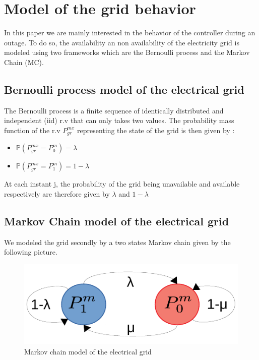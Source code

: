 \documentclass{ifacconf}
\begin{document}
 \section {Model of the grid behavior}
 In this paper we are mainly interested in the behavior of the controller during an outage. To do so, the availability an non availability of the electricity grid is modeled using two frameworks which are the Bernoulli process  and the Markov Chain (MC).
 \subsection{Bernoulli process model of the electrical grid}
 The Bernoulli process is a finite sequence of identically distributed and independent (iid) r.v that can only takes two values. The probability mass function of the r.v  $P_{gr}^{mx}$ representing the state of the  grid is then given by :
  \begin{itemize}
\item $\mathbb{P}(P_{gr}^{mx} = P_0^m) = \lambda $
\item $\mathbb{P}(P_{gr}^{mx} = P_1^m)= 1-\lambda$ 
\end{itemize}
At each instant j, the probability of the grid being unavailable and available respectively are therefore given by $\lambda$ and $1-\lambda$
 \subsection{Markov Chain model of the electrical grid }
 We modeled the grid secondly by a two states Markov chain given by the following picture.
 \begin{figure}[!ht]
        \begin{center}
                \includegraphics[width=0.65\columnwidth]{Figures/MarChain_paper.pdf}
        \end{center}

        \caption{Markov chain model of the electrical grid}
        \label{fig:MarChain}
\end{figure}
\end{document}
